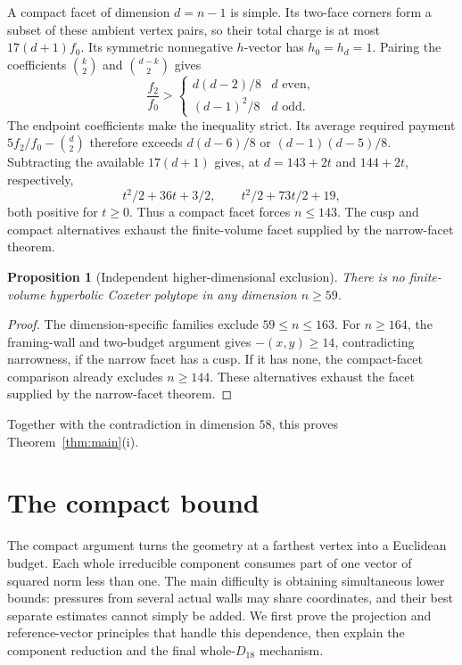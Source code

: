 \documentclass[11pt]{article}
\newtheorem{proposition}[theorem]{Proposition}
\theoremstyle{remark}\newtheorem{remark}[theorem]{Remark}
\numberwithin{equation}{section}
\begin{document}
A compact facet of dimension $d=n-1$ is simple. Its two-face
corners form a subset of these ambient vertex pairs, so their
total charge is at most $17(d+1)f_0$. Its symmetric nonnegative
$h$-vector has $h_0=h_d=1$. Pairing the coefficients
$\binom k2$ and $\binom{d-k}2$ gives
\[
 \frac{f_2}{f_0}>
 \begin{cases}d(d-2)/8&d\text{ even},\\
 (d-1)^2/8&d\text{ odd}.
 \end{cases}
\]
The endpoint coefficients make the inequality strict. Its average
required payment $5f_2/f_0-\binom d2$ therefore exceeds
$d(d-6)/8$ or $(d-1)(d-5)/8$. Subtracting the available
$17(d+1)$ gives, at $d=143+2t$ and $144+2t$, respectively,
\[
 t^2/2+36t+3/2,\qquad t^2/2+73t/2+19,
\]
both positive for $t\ge0$. Thus a compact facet forces $n\le143$.
The cusp and compact alternatives exhaust the finite-volume facet
supplied by the narrow-facet theorem.

\begin{proposition}[Independent higher-dimensional exclusion]\label{prop:fvtail}
There is no finite-volume hyperbolic Coxeter polytope in any dimension
$n\ge59$.
\end{proposition}
\begin{proof}
The dimension-specific families exclude $59\le n\le163$. For
$n\ge164$, the framing-wall and two-budget argument gives
$-(x,y)\ge14$, contradicting narrowness, if the narrow facet has a cusp.
If it has none, the compact-facet comparison already excludes $n\ge144$.
These alternatives exhaust the facet supplied by the narrow-facet theorem.
\end{proof}
Together with the contradiction in dimension $58$, this proves
Theorem~\ref{thm:main}(i).


\section{The compact bound}\label{sec:compact}
The compact argument turns the geometry at a farthest vertex into a
Euclidean budget. Each whole irreducible component consumes part of one
vector of squared norm less than one. The main difficulty is obtaining
simultaneous lower bounds: pressures from several actual walls may share
coordinates, and their best separate estimates cannot simply be added.
We first prove the projection and reference-vector principles that handle
this dependence, then explain the component reduction and the final
whole-$D_{18}$ mechanism.
\end{document}
